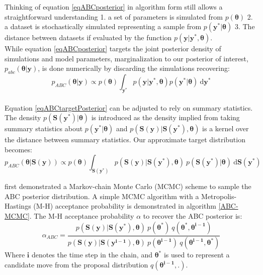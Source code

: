 Thinking of equation \ref{eqABCposterior} in algorithm form still allows a straightforward understanding 1. a set of parameters is simulated from $ p(\bm{\theta})$ 2. a dataset is stochastically simulated representing a sample from $p(\bm{y^*}|\bm{\theta})$ 3. The distance between datasets if evaluated by the function $p(\bm{y}|\bm{y^*},\bm{\theta})$. \\

While equation \ref{eqABCposterior} targets the joint posterior density of simulations and model parameters, marginalization to our posterior of interest, $p_{abc}(\bm{\theta}|\bm{y})$, is done numerically by discarding the simulations recovering:
\begin{equation}
p_{ABC}(\bm{\theta}|\bm{y}) \propto p(\bm{\theta}) \int_{\bm{y^*}} p(\bm{y}|\bm{y^*},\bm{\theta}) p(\bm{y^*}|\bm{\theta})\ \text{d}\bm{y^*}
\label{eqABCtargetPosterior}
\end{equation}\\

Equation \ref{eqABCtargetPosterior} can be adjusted to rely on summary statistics. The density $p(\bm{S}(\bm{y^*})|\bm{\theta})$ is introduced as the density implied from taking summary statistics about $p(\bm{y^*}|\bm{\theta})$ and $p(\bm{S}(\bm{y})|\bm{S}(\bm{y^*}),\bm{\theta})$ is a kernel over the distance between summary statistics. Our approximate target distribution becomes:
\begin{equation}
p_{ABC}(\bm{\theta}|\bm{S}(\bm{y})) \propto p(\bm{\theta}) \int_{\bm{S}(\bm{y^*})} p(\bm{S}(\bm{y})|\bm{S}(\bm{y^*}),\bm{\theta})\  p(\bm{S}(\bm{y^*})|\bm{\theta})\ \text{d}\bm{S}(\bm{y^*})
\end{equation}

\citet{Marjoram2003} first demonstrated a Markov-chain Monte Carlo (MCMC) scheme to sample the ABC posterior distribution. A simple MCMC algorithm with a Metropolis-Hastings (M-H) acceptance probability is demonstrated in algorithm \ref{ABC-MCMC}. The M-H acceptance probability $\alpha$ to recover the ABC posterior is:
\begin{equation}
\alpha_{ABC} = \frac{p(\bm{S}(\bm{y})|\bm{S}(\bm{y^*}),\bm{\theta})\ p(\bm{\theta^*})\ q(\bm{\theta^*},\bm{\theta^{i-1}})} {p(\bm{S}(\bm{y})|\bm{S}(\bm{y^{i-1}}),\bm{\theta})\ p(\bm{\theta^{i-1}})\ q(\bm{\theta^{i-1}},\bm{\theta^*})}
\end{equation}
Where $\bm{i}$ denotes the time step in the chain, and $\bm{\theta^*}$ is used to represent a candidate move from the proposal distribution $q(\bm{\theta^{i-1}}, . )$.


